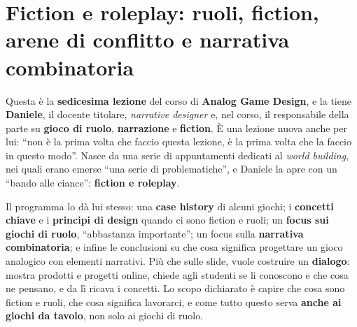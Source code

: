 %
%
%    
%    
%

\chapter[Fiction e roleplay]{Fiction e roleplay: ruoli, fiction, arene di conflitto e
narrativa combinatoria}
\label{a16:cap:fiction}

Questa è la \textbf{sedicesima lezione} del corso di \textbf{Analog Game Design}, e la tiene
\textbf{Daniele}, il docente titolare, \emph{narrative designer} e, nel corso, il
responsabile della parte su \textbf{gioco di ruolo}, \textbf{narrazione} e
\textbf{fiction}. È una lezione nuova anche per lui: ``non è la prima volta che faccio questa
lezione, è la prima volta che la faccio in questo modo''. Nasce da una serie di appuntamenti
dedicati al \emph{world building}, nei quali erano emerse ``una serie di problematiche'', e
Daniele la apre con un ``bando alle ciance'': \textbf{fiction e roleplay}.

Il programma lo dà lui stesso: una \textbf{case history} di alcuni giochi; i
\textbf{concetti chiave} e i \textbf{principi di design} quando ci sono fiction e ruoli; un
\textbf{focus sui giochi di ruolo}, ``abbastanza importante''; un focus sulla
\textbf{narrativa combinatoria}; e infine le conclusioni su che cosa significa progettare un
gioco analogico con elementi narrativi. Più che sulle slide, vuole costruire un
\textbf{dialogo}: mostra prodotti e progetti online, chiede agli studenti se li conoscono e
che cosa ne pensano, e da lì ricava i concetti. Lo scopo dichiarato è capire che cosa sono
fiction e ruoli, che cosa significa lavorarci, e come tutto questo serva \textbf{anche ai
giochi da tavolo}, non solo ai giochi di ruolo.

